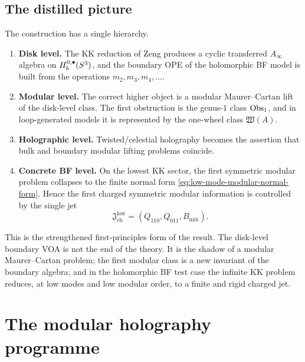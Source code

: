\subsection{The distilled picture}

The construction has a single hierarchy.

\begin{enumerate}[label=\textup{(\arabic*)}]
\item \textbf{Disk level.}
The KK reduction of Zeng produces a cyclic transferred $A_\infty$ algebra on
$H_b^{0,\bullet}(S^3)$, and the boundary OPE of the holomorphic BF model is built from the operations
$m_2,m_3,m_4,\dots$.

\item \textbf{Modular level.}
The correct higher object is a modular Maurer--Cartan lift of the disk-level class. The first
obstruction is the genus-$1$ class $\operatorname{Obs}_1$, and in loop-generated models it is represented by
the one-wheel class $\mathfrak W(A)$.

\item \textbf{Holographic level.}
Twisted/celestial holography becomes the assertion that bulk and boundary modular lifting
problems coincide.

\item \textbf{Concrete BF level.}
On the lowest KK sector, the first symmetric modular problem collapses to the finite normal
form \eqref{eq:low-mode-modular-normal-form}. Hence the first charged symmetric modular
information is controlled by the single jet
\[
\mathfrak J_{\mathrm{ch}}^{\mathrm{low}}=(Q_{110},Q_{011},B_{\mathrm{mix}}).
\]
\end{enumerate}

This is the strengthened first-principles form of the result. The disk-level boundary
VOA is not the end of the theory. It is the shadow of a modular Maurer--Cartan problem; the
first modular class is a new invariant of the boundary algebra; and in the holomorphic BF test
case the infinite KK problem reduces, at low modes and low modular order, to a finite and
rigid charged jet.


\providecommand{\ModEnv}{\operatorname{ModEnv}}
\providecommand{\Fact}{\operatorname{Fact}}
\providecommand{\ot}{\widehat\otimes}

\section{The modular holography programme}

